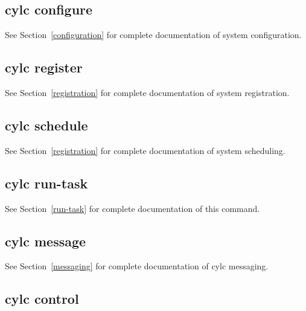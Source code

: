 \documentclass[11pt,a4paper]{article}
\begin{document}
\pagebreak
\subsection{cylc configure}
\label{cylcconfigure}

See Section~\ref{configuration} for complete documentation of system
configuration.

{ 
 
}

\pagebreak
\subsection{cylc register}

See Section~\ref{registration} for complete documentation of system
registration.


{ 
 
}

\pagebreak
\subsection{cylc schedule}
\label{cylcschedule}

See Section~\ref{registration} for complete documentation of system
scheduling.

{

}

\pagebreak
\subsection{cylc run-task}
\label{cylcmessage}

See Section~\ref{run-task} for complete documentation of this command.

{

}

\pagebreak
\subsection{cylc message}
\label{cylcmessage}

See Section~\ref{messaging} for complete documentation of cylc messaging.

{

}

\pagebreak
\subsection{cylc control}
\label{cylccontrol}
\end{document}
